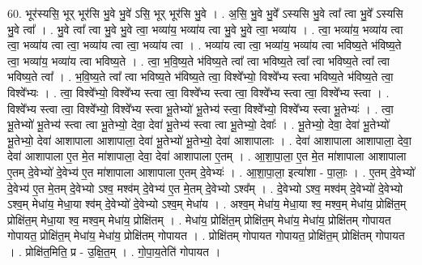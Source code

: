 \documentclass[17pt]{extarticle}
\begin{document}
60. भूर॑स्यसि॒ भूर् भूर॑सि भु॒वे भु॒वे॑ ऽसि॒ भूर् भूर॑सि भु॒वे । . अ॒सि॒ भु॒वे भु॒वे᳚ ऽस्यसि भु॒वे त्वा᳚ त्वा भु॒वे᳚ ऽस्यसि भु॒वे त्वा᳚ । . भु॒वे त्वा᳚ त्वा भु॒वे भु॒वे त्वा॒ भव्या॑य॒ भव्या॑य त्वा भु॒वे भु॒वे त्वा॒ भव्या॑य । . त्वा॒ भव्या॑य॒ भव्या॑य त्वा त्वा॒ भव्या॑य त्वा त्वा॒ भव्या॑य त्वा त्वा॒ भव्या॑य त्वा । . भव्या॑य त्वा त्वा॒ भव्या॑य॒ भव्या॑य त्वा भविष्य॒ते भ॑विष्य॒ते त्वा॒ भव्या॑य॒ भव्या॑य त्वा भविष्य॒ते । . त्वा॒ भ॒वि॒ष्य॒ते भ॑विष्य॒ते त्वा᳚ त्वा भविष्य॒ते त्वा᳚ त्वा भविष्य॒ते त्वा᳚ त्वा भविष्य॒ते त्वा᳚ । . भ॒वि॒ष्य॒ते त्वा᳚ त्वा भविष्य॒ते भ॑विष्य॒ते त्वा॒ विश्वे᳚भ्यो॒ विश्वे᳚भ्य स्त्वा भविष्य॒ते भ॑विष्य॒ते त्वा॒ विश्वे᳚भ्यः । . त्वा॒ विश्वे᳚भ्यो॒ विश्वे᳚भ्य स्त्वा त्वा॒ विश्वे᳚भ्य स्त्वा त्वा॒ विश्वे᳚भ्य स्त्वा त्वा॒ विश्वे᳚भ्य स्त्वा । . विश्वे᳚भ्य स्त्वा त्वा॒ विश्वे᳚भ्यो॒ विश्वे᳚भ्य स्त्वा भू॒तेभ्यो॑ भू॒तेभ्य॑ स्त्वा॒ विश्वे᳚भ्यो॒ विश्वे᳚भ्य स्त्वा भू॒तेभ्यः॑ । . त्वा॒ भू॒तेभ्यो॑ भू॒तेभ्य॑ स्त्वा त्वा भू॒तेभ्यो॒ देवा॒ देवा॑ भू॒तेभ्य॑ स्त्वा त्वा भू॒तेभ्यो॒ देवाः᳚ । . भू॒तेभ्यो॒ देवा॒ देवा॑ भू॒तेभ्यो॑ भू॒तेभ्यो॒ देवा॑ आशापाला आशापाला॒ देवा॑ भू॒तेभ्यो॑ भू॒तेभ्यो॒ देवा॑ आशापालाः । . देवा॑ आशापाला आशापाला॒ देवा॒ देवा॑ आशापाला ए॒त मे॒त मा॑शापाला॒ देवा॒ देवा॑ आशापाला ए॒तम् । . आ॒शा॒पा॒ला॒ ए॒त मे॒त मा॑शापाला आशापाला ए॒तम् दे॒वेभ्यो॑ दे॒वेभ्य॑ ए॒त मा॑शापाला आशापाला ए॒तम् दे॒वेभ्यः॑ । . आ॒शा॒पा॒ला॒ इत्या॑शा - पा॒लाः॒ । . ए॒तम् दे॒वेभ्यो॑ दे॒वेभ्य॑ ए॒त मे॒तम् दे॒वेभ्यो ऽश्व॒ मश्व॑म् दे॒वेभ्य॑ ए॒त मे॒तम् दे॒वेभ्यो ऽश्व᳚म् । . दे॒वेभ्यो ऽश्व॒ मश्व॑म् दे॒वेभ्यो॑ दे॒वेभ्यो ऽश्व॒म् मेधा॑य॒ मेधा॒या श्व॑म् दे॒वेभ्यो॑ दे॒वेभ्यो ऽश्व॒म् मेधा॑य । . अश्व॒म् मेधा॑य॒ मेधा॒या श्व॒ मश्व॒म् मेधा॑य॒ प्रोक्षि॑त॒म् प्रोक्षि॑त॒म् मेधा॒या श्व॒ मश्व॒म् मेधा॑य॒ प्रोक्षि॑तम् । . मेधा॑य॒ प्रोक्षि॑त॒म् प्रोक्षि॑त॒म् मेधा॑य॒ मेधा॑य॒ प्रोक्षि॑तम् गोपायत गोपायत॒ प्रोक्षि॑त॒म् मेधा॑य॒ मेधा॑य॒ प्रोक्षि॑तम् गोपायत । . प्रोक्षि॑तम् गोपायत गोपायत॒ प्रोक्षि॑त॒म् प्रोक्षि॑तम् गोपायत । . प्रोक्षि॑त॒मिति॒ प्र - उ॒क्षि॒त॒म् । . गो॒पा॒य॒तेति॑ गोपायत । \newline
\pagebreak
{}
\end{document}
